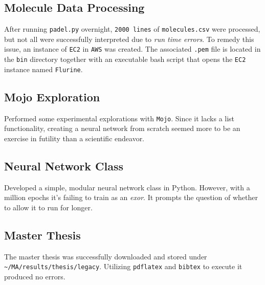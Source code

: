 \documentclass{article}
\begin{document}
\subsection*{Molecule Data Processing}
After running \texttt{padel.py} overnight, \texttt{2000 lines} of \texttt{molecules.csv} were processed, but not all were successfully interpreted due to \textit{run time errors}. To remedy this issue, an instance of \texttt{EC2} in \texttt{AWS} was created. The associated \texttt{.pem} file is located in the \texttt{bin} directory together with an executable bash script that opens the \texttt{EC2} instance named \texttt{Flurine}.

\subsection*{Mojo Exploration}
Performed some experimental explorations with \texttt{Mojo}. Since it lacks a list functionality, creating a neural network from scratch seemed more to be an exercise in futility than a scientific endeavor. 

\subsection*{Neural Network Class}
Developed a simple, modular neural network class in Python. However, with a million epochs it's failing to train as an \textit{exor}. It prompts the question of whether to allow it to run for longer.  

\subsection*{Master Thesis}
The master thesis was successfully downloaded and stored under \verb|~/MA/results/thesis/legacy|. Utilizing \texttt{pdflatex} and \texttt{bibtex} to execute it produced no errors.
\end{document}
